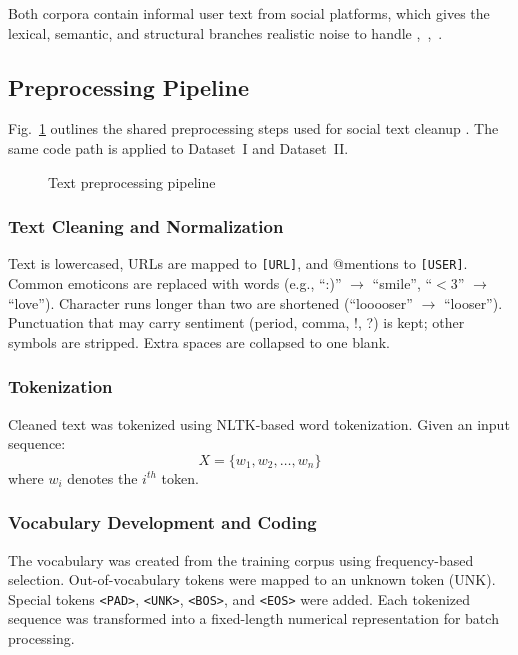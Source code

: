 Both corpora contain informal user text from social platforms, which gives the lexical, semantic, and structural branches realistic noise to handle \cite{ref8},~\cite{ref9},~\cite{ref19}.

\subsection{Preprocessing Pipeline}

Fig.~\ref{fig:preprocessing} outlines the shared preprocessing steps used for social text cleanup \cite{ref12}. The same code path is applied to Dataset~I and Dataset~II.

\begin{figure}[!t]
\centering

\caption{Text preprocessing pipeline}
\label{fig:preprocessing}
\end{figure}

\subsubsection{Text Cleaning and Normalization}

Text is lowercased, URLs are mapped to \texttt{[URL]}, and @mentions to \texttt{[USER]}. Common emoticons are replaced with words (e.g., ``:)'' $\rightarrow$ ``smile'', ``$<$3'' $\rightarrow$ ``love''). Character runs longer than two are shortened (``looooser'' $\rightarrow$ ``looser''). Punctuation that may carry sentiment (period, comma, !, ?) is kept; other symbols are stripped. Extra spaces are collapsed to one blank.

\subsubsection{Tokenization}

Cleaned text was tokenized using NLTK-based word tokenization. Given an input sequence:
\[
X = \{ w_1, w_2, \ldots, w_n \}
\]
where $w_i$ denotes the $i^{th}$ token.

\subsubsection{Vocabulary Development and Coding}

The vocabulary was created from the training corpus using frequency-based selection. Out-of-vocabulary tokens were mapped to an unknown token (UNK). Special tokens \texttt{<PAD>}, \texttt{<UNK>}, \texttt{<BOS>}, and \texttt{<EOS>} were added. Each tokenized sequence was transformed into a fixed-length numerical representation for batch processing.

